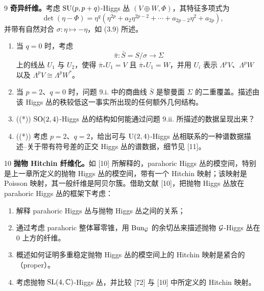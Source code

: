 
\begin{prob}{9}
\textbf{奇异纤维。}考虑 $\mathrm{SU}(p,p+q)$-Higgs 丛 $(V\oplus W,\Phi)$，其特征多项式为
\[
\det(\eta-\Phi)=\eta^q(\eta^{2p}+a_2\eta^{2p-2}+\cdots+a_{2p-2}\eta^2+a_{2p}),
\]
并带有自然对合 $\sigma:\eta\mapsto-\eta$，如 (3.9) 所述。

\begin{enumerate}[label=(\roman*),leftmargin=2.2em]
\item 当 $q=0$ 时，考虑
\[
\bar\pi:\bar S=S/\sigma\to\Sigma
\]
上的线丛 $U_1$ 与 $U_2$，使得 $\bar\pi_*U_1=V$ 且 $\bar\pi_*U_1=W$，并用 $U_i$ 表示 $\Lambda^pV$、$\Lambda^pW$ 以及 $\Lambda^pV\cong\Lambda^pW^*$。
\item 当 $p=2$、$q=0$ 时，问题 9.i. 中的商曲线 $\bar S$ 是黎曼面 $\Sigma$ 的二重覆盖。描述由该 Higgs 丛的秩较低这一事实所出现的任何额外几何结构。
\item ((*)) $\mathrm{SO}(2,4)$-Higgs 丛的结构如何能通过问题 9.ii. 所描述的数据呈现出来？
\item ((*)) 考虑 $p=2$、$q=2$，给出可与 $\mathrm{U}(2,4)$-Higgs 丛相联系的一种谱数据描述--关于带有符号差的正交 Higgs 丛的谱数据，细节见 [11]。
\end{enumerate}
\end{prob}


\begin{prob}{10}
\textbf{抛物 Hitchin 纤维化。}如 [10] 所解释的，parahoric Higgs 丛的模空间，特别是上一章所定义的抛物 Higgs 丛的模空间，带有一个 Hitchin 映射；该映射是 Poisson 映射，其一般纤维是阿贝尔簇。借助文献 [10]，把抛物 Higgs 丛放在 parahoric Higgs 丛的框架下考虑：

\begin{enumerate}[label=(\roman*),leftmargin=2.2em]
\item 解释 parahoric Higgs 丛与抛物 Higgs 丛之间的关系；
\item 通过考虑 parahoric 整体幂零锥，用 $\operatorname{Bun}_{\mathcal{G}}$ 的余切丛来描述抛物 $\mathcal{G}$-Higgs 丛在 $0$ 上方的纤维。
\item 概述如何证明多重稳定抛物 Higgs 丛的模空间上的 Hitchin 映射是紧合的（proper）。
\item 考虑抛物 $\mathrm{SL}(4,\mathbb{C})$-Higgs 丛，并比较 [72] 与 [10] 中所定义的 Hitchin 映射。
\end{enumerate}
\end{prob}

